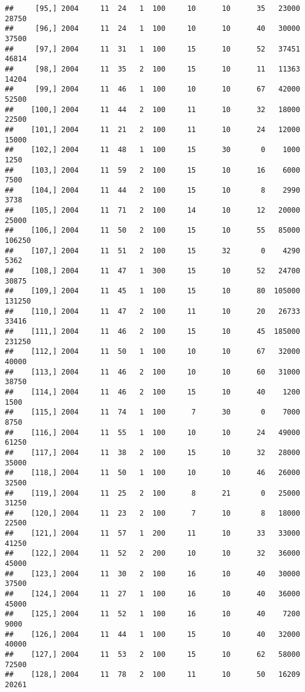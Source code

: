 \documentclass{article}\usepackage[]{graphicx}\usepackage[]{color}
\makeatletter
\newenvironment{kframe}{%
 \def\at@end@of@kframe{}%
 \ifinner\ifhmode%
  \def\at@end@of@kframe{\end{minipage}}%
  \begin{minipage}{\columnwidth}%
 \fi\fi%
 \def\FrameCommand##1{\hskip\@totalleftmargin \hskip-\fboxsep
 \colorbox{shadecolor}{##1}\hskip-\fboxsep
     \hskip-\linewidth \hskip-\@totalleftmargin \hskip\columnwidth}%
 \MakeFramed {\advance\hsize-\width
   \@totalleftmargin\z@ \linewidth\hsize
   \@setminipage}}%
 {\par\unskip\endMakeFramed%
 \at@end@of@kframe}
\newenvironment{knitrout}{}{} %
\makeatother
\begin{document}
\begin{knitrout}
\begin{kframe}
\begin{verbatim}
##     [95,] 2004     11  24   1  100     10      10      35   23000   28750
##     [96,] 2004     11  24   1  100     10      10      40   30000   37500
##     [97,] 2004     11  31   1  100     15      10      52   37451   46814
##     [98,] 2004     11  35   2  100     15      10      11   11363   14204
##     [99,] 2004     11  46   1  100     10      10      67   42000   52500
##    [100,] 2004     11  44   2  100     11      10      32   18000   22500
##    [101,] 2004     11  21   2  100     11      10      24   12000   15000
##    [102,] 2004     11  48   1  100     15      30       0    1000    1250
##    [103,] 2004     11  59   2  100     15      10      16    6000    7500
##    [104,] 2004     11  44   2  100     15      10       8    2990    3738
##    [105,] 2004     11  71   2  100     14      10      12   20000   25000
##    [106,] 2004     11  50   2  100     15      10      55   85000  106250
##    [107,] 2004     11  51   2  100     15      32       0    4290    5362
##    [108,] 2004     11  47   1  300     15      10      52   24700   30875
##    [109,] 2004     11  45   1  100     15      10      80  105000  131250
##    [110,] 2004     11  47   2  100     11      10      20   26733   33416
##    [111,] 2004     11  46   2  100     15      10      45  185000  231250
##    [112,] 2004     11  50   1  100     10      10      67   32000   40000
##    [113,] 2004     11  46   2  100     10      10      60   31000   38750
##    [114,] 2004     11  46   2  100     15      10      40    1200    1500
##    [115,] 2004     11  74   1  100      7      30       0    7000    8750
##    [116,] 2004     11  55   1  100     10      10      24   49000   61250
##    [117,] 2004     11  38   2  100     15      10      32   28000   35000
##    [118,] 2004     11  50   1  100     10      10      46   26000   32500
##    [119,] 2004     11  25   2  100      8      21       0   25000   31250
##    [120,] 2004     11  23   2  100      7      10       8   18000   22500
##    [121,] 2004     11  57   1  200     11      10      33   33000   41250
##    [122,] 2004     11  52   2  200     10      10      32   36000   45000
##    [123,] 2004     11  30   2  100     16      10      40   30000   37500
##    [124,] 2004     11  27   1  100     16      10      40   36000   45000
##    [125,] 2004     11  52   1  100     16      10      40    7200    9000
##    [126,] 2004     11  44   1  100     15      10      40   32000   40000
##    [127,] 2004     11  53   2  100     15      10      62   58000   72500
##    [128,] 2004     11  78   2  100     11      10      50   16209   20261

\end{verbatim}
\end{kframe}
\end{knitrout}
\end{document}
